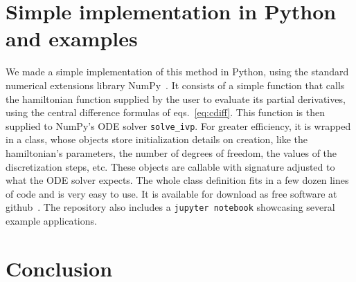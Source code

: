 \documentclass{iopart}
\begin{document}
%
%
%
\section{Simple implementation in Python and examples}
We made a simple implementation of this method in Python, using the standard
numerical extensions library NumPy~\cite{numpy:2011,numpy:2020}.  It consists of
a simple function that calls the hamiltonian function supplied by the user to
evaluate its partial derivatives, using the central difference formulas of
eqs.~\eqref{eq:cdiff}. This function is then supplied to NumPy's ODE solver
\texttt{solve\_ivp}.  For greater efficiency, it is wrapped in a class, whose
objects store initialization details on creation, like the hamiltonian's
parameters, the number of degrees of freedom, the values of the discretization
steps, etc. These objects are callable with signature adjusted to what the ODE
solver expects.  The whole class definition fits in a few dozen lines of code
and is very easy to use. It is available for download as free software at
github~\cite{nevh:2020}. The repository also includes a \texttt{jupyter
notebook} showcasing several example applications.



\section{Conclusion}
\end{document}
